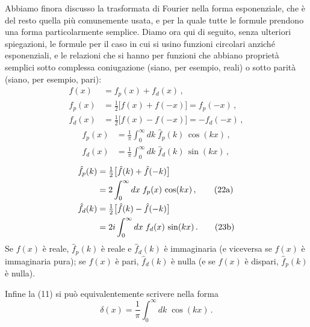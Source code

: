 \documentclass[11pt, a4paper]{book}
\numberwithin{equation}{section}
\begin{document}
Abbiamo finora discusso la trasformata di Fourier nella forma esponenziale, che è del resto quella più comunemente usata, e per la quale tutte le formule prendono una forma particolarmente semplice. Diamo ora qui di seguito, senza ulteriori spiegazioni, le formule per il caso in cui si usino funzioni circolari anziché esponenziali, e le relazioni che si hanno per funzioni che abbiano proprietà semplici sotto complessa coniugazione (siano, per esempio, reali) o sotto parità (siano, per esempio, pari):
\begin{align}
  f(x) &= f_p(x) + f_d(x)\,, \tag{19}\\
  f_p(x) &= \tfrac{1}{2}\bigl[f(x)+f(-x)\bigr] = f_p(-x)\,, \tag{20a} %
  \\
  f_d(x) &= \tfrac{1}{2}\bigl[f(x)-f(-x)\bigr] = -f_d(-x)\,, \tag{20b}
\end{align}
\begin{align}
  f_p(x) &= \frac{1}{\pi}\int_0^\infty dk\;\hat{f}_p(k)\,\cos(kx)\,, \tag{21a}\\
  f_d(x) &= \frac{1}{\pi}\int_0^\infty dk\;\hat{f}_d(k)\,\sin(kx)\,, \tag{21b}
\end{align}
\begin{align}
  \hat{f}_p(k) &= \tfrac{1}{2}\bigl[\hat{f}(k)+\hat{f}(-k)\bigr] \notag\\
  &= 2\int_0^\infty dx\;f_p(x)\,\cos(kx)\,, \tag{22a}\\
  \hat{f}_d(k) &= \tfrac{1}{2}\bigl[\hat{f}(k)-\hat{f}(-k)\bigr] \notag\\
  &= 2i\int_0^\infty dx\;f_d(x)\,\sin(kx)\,. \tag{23b}
\end{align}
Se $f(x)$ è reale, $\hat{f}_p(k)$ è reale e $\hat{f}_d(k)$ è immaginaria (e viceversa se $f(x)$ è immaginaria pura); se $f(x)$ è pari, $\hat{f}_d(k)$ è nulla (e se $f(x)$ è dispari, $\hat{f}_p(k)$ è nulla).

Infine la (11) si può equivalentemente scrivere nella forma
\begin{equation}
  \delta(x) = \frac{1}{\pi}\int_0^\infty dk\;\cos(kx)\,. \tag{24}
\end{equation}
\end{document}
